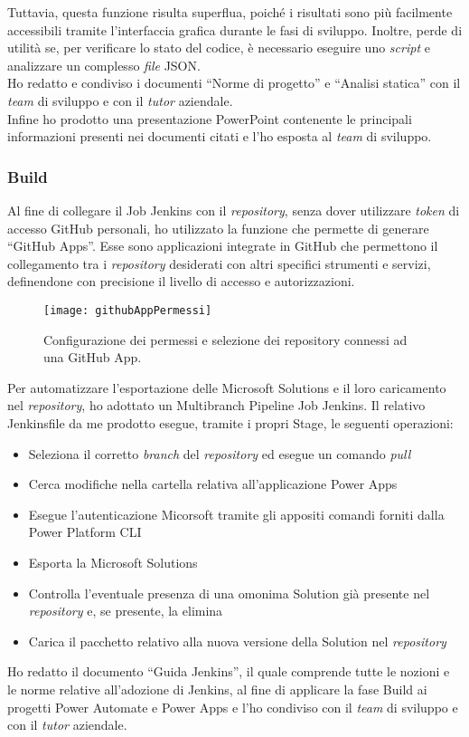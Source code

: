Tuttavia, questa funzione risulta superflua, poiché i risultati sono più facilmente accessibili tramite l'interfaccia grafica durante le fasi di sviluppo.
Inoltre, perde di utilità se, per verificare lo stato del codice, è necessario eseguire uno \emph{script} e analizzare un complesso \emph{file} JSON.\\ 
Ho redatto e condiviso i documenti “Norme di progetto” e “Analisi statica” con il \emph{team} di sviluppo e con il \emph{\emph{tutor}} aziendale.\\  
Infine ho prodotto una presentazione PowerPoint contenente le principali informazioni presenti nei documenti citati e l'ho esposta al \emph{team} di sviluppo. 

\subsubsection*{Build}
Al fine di collegare il Job Jenkins con il \emph{repository}, senza dover utilizzare \emph{token} di accesso GitHub personali, ho utilizzato la funzione che permette di generare “GitHub Apps”.
Esse sono applicazioni integrate in GitHub che permettono il collegamento tra i \emph{repository} desiderati con altri specifici strumenti e servizi, definendone con precisione il livello di accesso e autorizzazioni.  
\begin{figure}[htbp] 
    \centering 
    \texttt{[image: githubAppPermessi]} 
    \caption{Configurazione dei permessi e selezione dei repository connessi ad una GitHub App.}
    \label{fig:githubAppPermessi}
\end{figure}
\newline Per automatizzare l'esportazione delle Microsoft Solutions e il loro caricamento nel \emph{repository}, ho adottato un Multibranch Pipeline Job Jenkins. Il relativo Jenkinsfile da me prodotto esegue, tramite i propri Stage, le seguenti operazioni:
\begin{itemize}
    \item Seleziona il corretto \emph{branch} del \emph{repository} ed esegue un comando \emph{pull}
    \item Cerca modifiche nella cartella relativa all'applicazione Power Apps
    \item Esegue l'autenticazione Micorsoft tramite gli appositi comandi forniti dalla Power Platform CLI
    \item Esporta la Microsoft Solutions
    \item Controlla l'eventuale presenza di una omonima Solution già presente nel \emph{repository} e, se presente, la elimina 
    \item Carica il pacchetto relativo alla nuova versione della Solution nel \emph{repository}
\end{itemize}
Ho redatto il documento “Guida Jenkins”, il quale comprende tutte le nozioni e le norme relative all'adozione di Jenkins, al fine di applicare la fase Build ai progetti Power Automate e Power Apps e l'ho condiviso con il \emph{team} di sviluppo e con il \emph{\emph{tutor}} aziendale.

